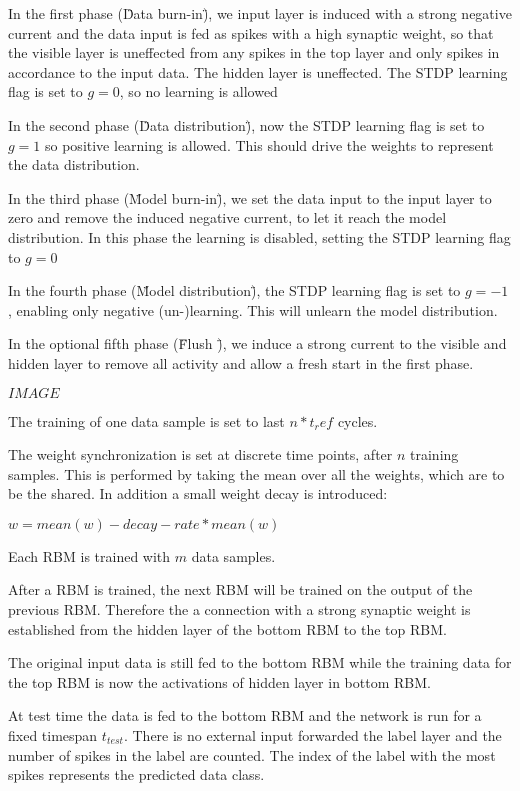 In the first phase (\"Data burn-in\"), we input layer is induced with a strong negative current and the data input is fed as spikes with a high synaptic weight, so that the visible layer is uneffected from any spikes in the top layer and only spikes in accordance to the input data.
The hidden layer is uneffected.
The STDP learning flag is set to $g=0$, so no learning is allowed

In the second phase (\"Data distribution\"), now the STDP learning flag is set to $g=1$ so positive learning is allowed.
This should drive the weights to represent the data distribution.

In the third phase (\"Model burn-in\"), we set the data input to the input layer to zero and remove the induced negative current, to let it reach the model distribution.
In this phase the learning is disabled, setting the STDP learning flag to $g=0$

In the fourth phase (\"Model distribution\"), the STDP learning flag is set to $g=-1$, enabling only negative (un-)learning.
This will unlearn the model distribution.

In the optional fifth phase (\"Flush \"), we induce a strong current to the visible and hidden layer to remove all activity and allow a fresh start in the first phase.

$IMAGE$

The training of one data sample is set to last $n * t_ref$ cycles.

The weight synchronization is set at discrete time points, after $n$ training samples.
This is performed by taking the mean over all the weights, which are to be the shared.
In addition a small weight decay is introduced:

$w = mean(w) - decay-rate * mean(w)$

Each RBM is trained with $m$ data samples.

After a RBM is trained, the next RBM will be trained on the output of the previous RBM.
Therefore the a connection with a strong synaptic weight is established from the hidden layer of the bottom RBM to the top RBM.

The original input data is still fed to the bottom RBM while the training data for the top RBM is now the activations of hidden layer in bottom RBM.


At test time the data is fed to the bottom RBM and the network is run for a fixed timespan $t_{test}$.
There is no external input forwarded the label layer and the number of spikes in the label are counted.
The index of the label with the most spikes represents the predicted data class.  


